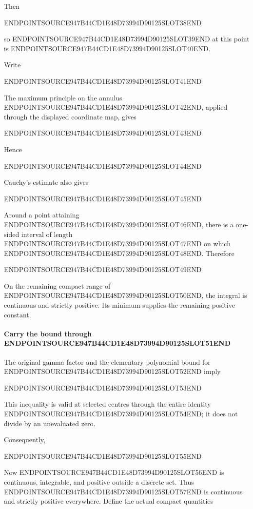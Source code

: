 Then

ENDPOINTSOURCE947B44CD1E48D73994D90125SLOT38END

so ENDPOINTSOURCE947B44CD1E48D73994D90125SLOT39END at this point is ENDPOINTSOURCE947B44CD1E48D73994D90125SLOT40END.

Write

ENDPOINTSOURCE947B44CD1E48D73994D90125SLOT41END

The maximum principle on the annulus ENDPOINTSOURCE947B44CD1E48D73994D90125SLOT42END, applied through the displayed coordinate map, gives

ENDPOINTSOURCE947B44CD1E48D73994D90125SLOT43END

Hence

ENDPOINTSOURCE947B44CD1E48D73994D90125SLOT44END

Cauchy's estimate also gives

ENDPOINTSOURCE947B44CD1E48D73994D90125SLOT45END

Around a point attaining ENDPOINTSOURCE947B44CD1E48D73994D90125SLOT46END, there is a one-sided interval of length ENDPOINTSOURCE947B44CD1E48D73994D90125SLOT47END on which ENDPOINTSOURCE947B44CD1E48D73994D90125SLOT48END. Therefore

ENDPOINTSOURCE947B44CD1E48D73994D90125SLOT49END

On the remaining compact range of ENDPOINTSOURCE947B44CD1E48D73994D90125SLOT50END, the integral is continuous and strictly positive. Its minimum supplies the remaining positive constant.

\paragraph{\texorpdfstring{Carry the bound through ENDPOINTSOURCE947B44CD1E48D73994D90125SLOT51END}{Carry the bound through }}\label{endpoint-user_norm_original--carry-the-bound-through-gh}

The original gamma factor and the elementary polynomial bound for ENDPOINTSOURCE947B44CD1E48D73994D90125SLOT52END imply

ENDPOINTSOURCE947B44CD1E48D73994D90125SLOT53END

This inequality is valid at selected centres through the entire identity ENDPOINTSOURCE947B44CD1E48D73994D90125SLOT54END; it does not divide by an unevaluated zero.

Consequently,

ENDPOINTSOURCE947B44CD1E48D73994D90125SLOT55END

Now ENDPOINTSOURCE947B44CD1E48D73994D90125SLOT56END is continuous, integrable, and positive outside a discrete set. Thus ENDPOINTSOURCE947B44CD1E48D73994D90125SLOT57END is continuous and strictly positive everywhere. Define the actual compact quantities

